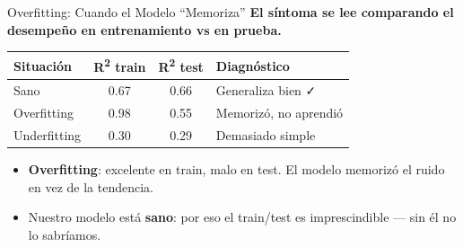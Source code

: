 \documentclass[aspectratio=169, 11pt]{beamer}
\begin{document}
\begin{frame}{Overfitting: Cuando el Modelo ``Memoriza''}
  \vspace{-6pt}
  {\small\color{arcaDark}\bfseries
    El síntoma se lee comparando el desempeño en entrenamiento vs en prueba.}

  \vspace{6pt}
  \centering
  {\footnotesize
  \renewcommand{\arraystretch}{1.5}
  \begin{tabular}{@{}l c c l@{}}
    \toprule
    {\bfseries\color{arcaDark} Situación} & {\bfseries\color{arcaDark} R\textsuperscript{2} train}
      & {\bfseries\color{arcaDark} R\textsuperscript{2} test} & {\bfseries\color{arcaDark} Diagnóstico} \\
    \midrule
    \rowcolor{arcaGray}
    Sano & 0.67 & 0.66 & {\color{codeGreen}Generaliza bien \faCheck} \\
    Overfitting & 0.98 & 0.55 & {\color{arcaRed}Memorizó, no aprendió} \\
    Underfitting & 0.30 & 0.29 & {\color{codeOrange}Demasiado simple} \\
    \bottomrule
  \end{tabular}
  }

  \vspace{8pt}
  {\footnotesize\color{textMuted}
  \begin{itemize}\setlength{\itemsep}{4pt}
    \item[{\color{arcaRed}\scriptsize\faArrowRight}]
      \textbf{Overfitting}: excelente en train, malo en test. El modelo
      memorizó el ruido en vez de la tendencia.
    \item[{\color{codeGreen}\scriptsize\faCheck}]
      Nuestro modelo está \textbf{sano}: por eso el train/test es
      imprescindible --- sin él no lo sabríamos.
  \end{itemize}
  }
\end{frame}
\end{document}
